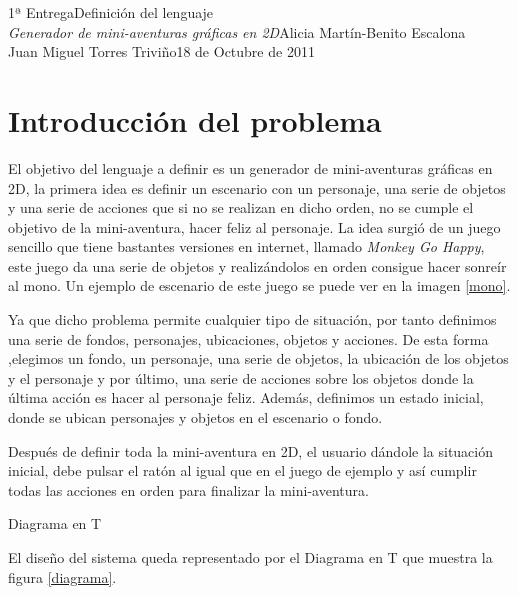 \documentclass[11pt,a4paper,spanish,twoside]{book}
\makeatletter
\renewcommand{\section}{
  \@startsection{section}{1}{0mm}{\baselineskip}
  {2.5mm}{\Large\bf}
}
\theoremstyle{plain} \newtheorem{nota}{Nota}
\makeatother
\begin{document}
{1ª Entrega}{Definición del lenguaje\\\emph{Generador de mini-aventuras 
gráficas en 2D}}{Alicia Martín-Benito Escalona\\Juan Miguel Torres Triviño}{18 
de Octubre de 2011}  


\tableofcontents
\listoffigures

\chapter{Introducción del problema}
El objetivo del lenguaje a definir es un generador de mini-aventuras gráficas 
en 2D, la primera idea es definir un escenario con un personaje, una serie de 
objetos y una serie de acciones que si no se realizan en dicho orden, no se 
cumple el objetivo de la mini-aventura, hacer feliz al personaje. La idea surgió
de un juego sencillo que tiene bastantes versiones en internet, llamado 
\emph{Monkey Go Happy}, este juego da una serie de objetos y realizándolos en 
orden consigue hacer sonreír al mono. Un ejemplo de escenario de este juego se 
puede ver en la imagen \ref{mono}.

Ya que dicho problema permite cualquier tipo de situación, por tanto definimos 
una serie de fondos, personajes, ubicaciones, objetos y acciones. De esta forma
,elegimos un fondo, un personaje, una serie de objetos, la ubicación de los 
objetos y el personaje y por último, una serie de acciones sobre los objetos 
donde la última acción es hacer al personaje feliz. Además, definimos un 
estado inicial, donde se ubican personajes y objetos en el escenario o fondo.

Después de definir toda la mini-aventura en 2D, el usuario dándole la situación
inicial, debe pulsar el ratón al igual que en el juego de ejemplo y así cumplir
todas las acciones en orden para finalizar la mini-aventura.
 
\section{Diagrama en T}

El diseño del sistema queda representado por el Diagrama en T que muestra la
figura \ref{diagrama}.
\end{document}
